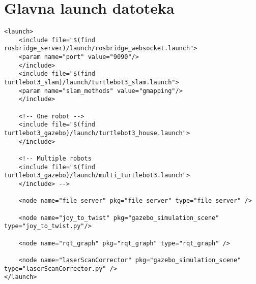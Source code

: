 
\section{Glavna launch datoteka}

\begin{lstlisting}
<launch>
	<include file="$(find rosbridge_server)/launch/rosbridge_websocket.launch">
	<param name="port" value="9090"/>
	</include>
	<include file="$(find turtlebot3_slam)/launch/turtlebot3_slam.launch">
	<param name="slam_methods" value="gmapping"/>
	</include>
	
	<!-- One robot -->
	<include file="$(find turtlebot3_gazebo)/launch/turtlebot3_house.launch">
	</include> 
	
	<!-- Multiple robots 	
	<include file="$(find turtlebot3_gazebo)/launch/multi_turtlebot3.launch">
	</include> -->	
	
	<node name="file_server" pkg="file_server" type="file_server" />
	
	<node name="joy_to_twist" pkg="gazebo_simulation_scene" type="joy_to_twist.py"/>
	
	<node name="rqt_graph" pkg="rqt_graph" type="rqt_graph" />
	
	<node name="laserScanCorrector" pkg="gazebo_simulation_scene" type="laserScanCorrector.py" />
</launch>
\end{lstlisting}